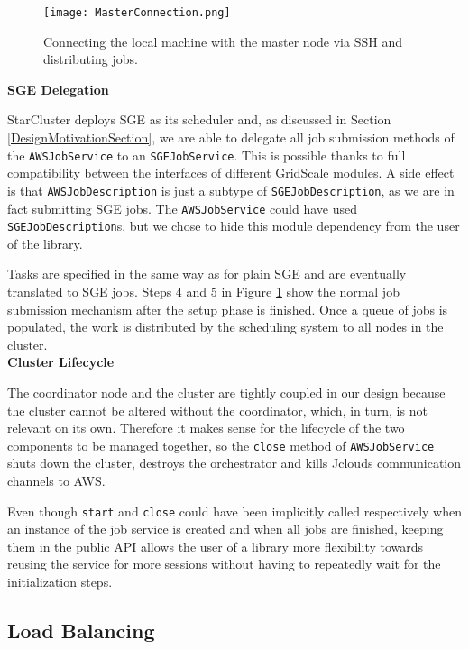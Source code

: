 \begin{figure}[h]
	\centering
		\texttt{[image: MasterConnection.png]}
	\caption{Connecting the local machine with the master node via SSH and distributing jobs.}
	\label{MasterConnection}
\end{figure}

\vspace{2mm}
\textbf{SGE Delegation}
\vspace{1mm}

StarCluster deploys SGE as its scheduler and, as discussed in Section \ref{DesignMotivationSection}, we are able to delegate all job submission methods of the \verb|AWSJobService| to an \verb|SGEJobService|. This is possible thanks to full compatibility between the interfaces of different GridScale modules. A side effect is that \verb|AWSJobDescription| is just a subtype of \verb|SGEJobDescription|, as we are in fact submitting SGE jobs. The \verb|AWSJobService| could have used \verb|SGEJobDescription|s, but we chose to hide this module dependency from the user of the library.

 Tasks are specified in the same way as for plain SGE and are eventually translated to SGE jobs. Steps 4 and 5 in Figure \ref{MasterConnection} show the normal job submission mechanism after the setup phase is finished. Once a queue of jobs is populated, the work is distributed by the scheduling system to all nodes in the cluster.\\

\vspace{3mm}
\textbf{Cluster Lifecycle}
\vspace{1mm}

The coordinator node and the cluster are tightly coupled in our design because the cluster cannot be altered without the coordinator, which, in turn, is not relevant on its own. Therefore it makes sense for the lifecycle of the two components to be managed together, so the \verb|close| method of \verb|AWSJobService| shuts down the cluster, destroys the orchestrator and kills Jclouds communication channels to AWS.

Even though \verb|start| and \verb|close| could have been implicitly called respectively when an instance of the job service is created and when all jobs are finished, keeping them in the public API allows the user of a library more flexibility towards reusing the service for more sessions without having to repeatedly wait for the initialization steps.

\subsection{Load Balancing}

